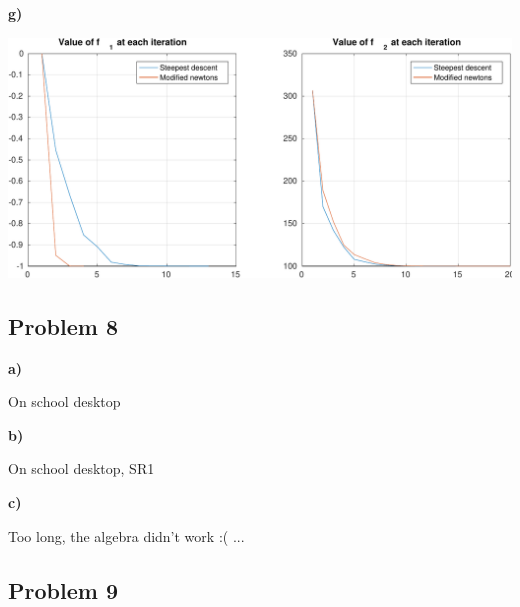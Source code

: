 \textbf{g)}

\answer

\includegraphics[width=\linewidth]{fig/unconstrained_exercices/pb7_1-crop}


\subsection{Problem 8}

\textbf{a)}

On school desktop

\textbf{b)}

On school desktop, SR1

\textbf{c)}

Too long, the algebra didn't work :( ...

\subsection{Problem 9}

